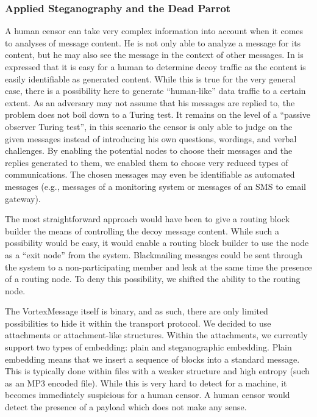 \documentclass[10pt,journal,compsoc,twocolumn,twoside]{IEEEtran}
\begin{document}
\subsubsection{Applied Steganography and the Dead Parrot}
A human censor can take very complex information into account when it comes to analyses of message content. He is not only able to analyze a message for its content, but he may also see the message in the context of other messages. In \cite{oakland2013-parrot} is expressed that it is easy for a human to determine decoy traffic as the content is easily identifiable as generated content. While this is true for the very general case, there is a possibility here to generate ``human-like'' data traffic to a certain extent. As an adversary may not assume that his messages are replied to, the problem does not boil down to a Turing test. It remains on the level of a ``passive observer Turing test'', in this scenario the censor is only able to judge on the given messages instead of introducing his own questions, wordings, and verbal challenges. By enabling the potential nodes to choose their messages and the replies generated to them, we enabled them to choose very reduced types of communications. The chosen messages may even be identifiable as automated messages (e.g., messages of a monitoring system or messages of an SMS to email gateway). 

The most straightforward approach would have been to give a routing block builder the means of controlling the decoy message content. While such a possibility would be easy, it would enable a routing block builder to use the node as a ``exit node'' from the system. Blackmailing messages could be sent through the system to a non-participating member and leak at the same time the presence of a routing node. To deny this possibility, we shifted the ability to the routing node.

The VortexMessage itself is binary, and as such, there are only limited possibilities to hide it within the transport protocol. We decided to use attachments or attachment-like structures. Within the attachments, we currently support two types of embedding: plain and steganographic embedding. Plain embedding means that we insert a sequence of blocks into a standard message. This is typically done within files with a weaker structure and high entropy (such as an MP3 encoded file). While this is very hard to detect for a machine, it becomes immediately suspicious for a human censor. A human censor would detect the presence of a payload which does not make any sense.
\end{document}
